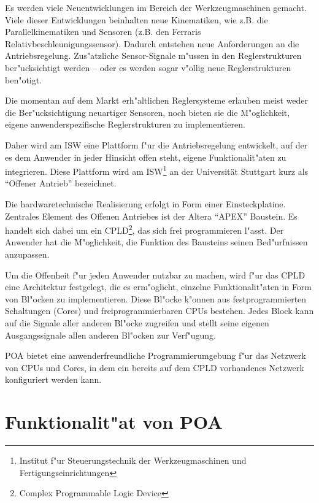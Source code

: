 \documentclass[a4paper,titlepage,12pt,ngerman]{scrbook}
\begin{document}
Es werden viele Neuentwicklungen im Bereich der Werkzeugmaschinen gemacht.
Viele dieser Entwicklungen beinhalten neue Kinematiken, wie z.B. die
Parallelkinematiken und Sensoren (z.B. den Ferraris 
Relativbeschleunigungssensor).
Dadurch entstehen neue Anforderungen an die Antriebsregelung. Zus"atzliche
Sensor-Signale m"ussen in den Reglerstrukturen ber"ucksichtigt werden -- oder
es werden sogar v"ollig neue Reglerstrukturen ben"otigt.\par
Die momentan auf dem Markt erh"altlichen Reglersysteme erlauben meist
weder die Ber"ucksichtigung neuartiger Sensoren, noch bieten sie die
M"oglichkeit, eigene anwenderspezifische Reglerstrukturen zu implementieren.\par
Daher wird am ISW eine Plattform f"ur die Antriebsregelung entwickelt,
auf der es dem Anwender in jeder Hinsicht offen steht, eigene Funktionalit"aten
zu integrieren. Diese Plattform wird am ISW\footnote{Institut f"ur Steuerungstechnik der Werkzeugmaschinen und Fertigungseinrichtungen} an der Universität Stuttgart kurz als ``Offener Antrieb''
bezeichnet.  \par
Die hardwaretechnische Realisierung erfolgt in Form einer Einsteckplatine.
Zentrales Element des Offenen Antriebes ist der Altera ``APEX'' Baustein. Es
handelt sich dabei um ein CPLD\footnote{Complex Programmable Logic Device},
das sich frei programmieren l"asst. Der Anwender hat die M"oglichkeit, die
Funktion des Bausteins seinen Bed"urfnissen anzupassen.\par
Um die Offenheit f"ur jeden Anwender nutzbar zu machen, wird f"ur das CPLD eine
Architektur festgelegt, die es erm"oglicht, einzelne Funktionalit"aten in Form
von Bl"ocken zu implementieren. Diese Bl"ocke k"onnen aus festprogrammierten
Schaltungen (Cores) und freiprogrammierbaren CPUs bestehen. Jedes Block kann
auf die Signale aller anderen Bl"ocke zugreifen und stellt seine eigenen
Ausgangssignale allen anderen Bl"ocken zur Verf"ugung.\par
POA bietet eine anwenderfreundliche Programmierumgebung f"ur das Netzwerk
von CPUs und Cores, in dem ein bereits auf dem CPLD vorhandenes
Netzwerk konfiguriert werden kann.\newpage




\section{Funktionalit"at von POA}
\end{document}
